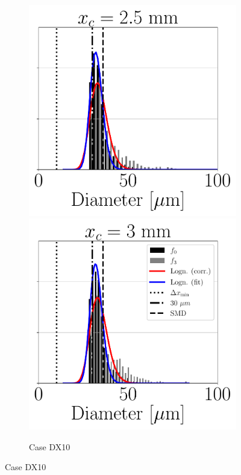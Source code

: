 \begin{figure}[ht]
\begin{subfigure}[b]{1.1\textwidth}
   \hspace*{-0.15in}
   \includegraphics[scale=0.28]{./part3_applications/figures_ch8_resolved/SPRAY_characterization/histograms_size_volume/DX10_xD08p33_histograms}
   \hspace*{-0.15in}
   \includegraphics[scale=0.28]{./part3_applications/figures_ch8_resolved/SPRAY_characterization/histograms_size_volume/DX10_xD10p00_histograms}
	\caption{Case DX10}
\end{subfigure}


\end{figure}
